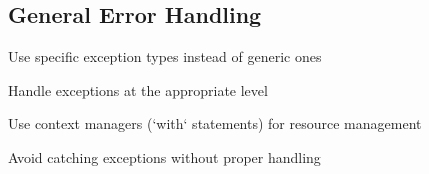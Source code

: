 \subsection{General Error Handling}

Use specific exception types instead of generic ones

Handle exceptions at the appropriate level

Use context managers (`with` statements) for resource management

Avoid catching exceptions without proper handling